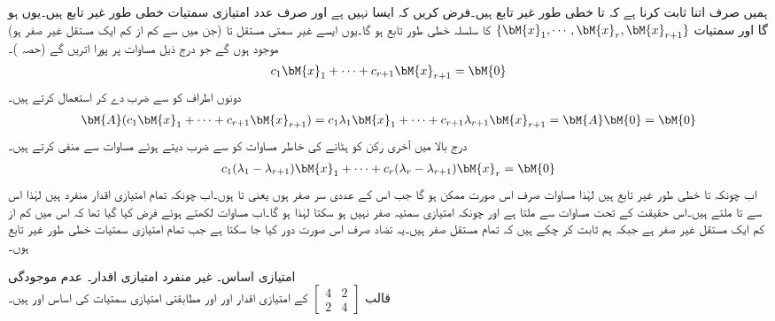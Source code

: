 ہمیں صرف اتنا ثابت کرنا ہے کہ  تا  خطی طور غیر تابع ہیں۔فرض کریں کہ ایسا نہیں ہے اور صرف  عدد امتیازی سمتیات خطی طور غیر تابع ہیں۔یوں  ہو گا اور  سمتیات
$\{\bM{x}_1, \cdots , \bM{x}_r,\bM{x}_{r+1}  \}$
کا سلسلہ خطی طور تابع ہو گا۔یوں ایسے غیر سمتی مستقل  تا  (جن میں سے کم از کم ایک مستقل غیر صفر ہو) موجود ہوں گے جو درج ذیل مساوات پر پورا اتریں گے (حصہ )۔
\begin{align}\label{مساوات_امتیازی_اساس_ثبوت_الف}
c_1\bM{x}_1+\cdots+c_{r+1}\bM{x}_{r+1}=\bM{0}
\end{align}  
دونوں اطراف کو  سے ضرب دے کر  استعمال کرتے ہیں۔
\begin{align}\label{مساوات_امتیازی_اساس_ثبوت_ب}
\bM{A}(c_1\bM{x}_1+\cdots+c_{r+1}\bM{x}_{r+1})=c_1\lambda_1\bM{x}_1+\cdots+c_{r+1}\lambda_{r+1}\bM{x}_{r+1}=\bM{A}\bM{0}=\bM{0}
\end{align}  
درج بالا میں آخری رکن کو ہٹانے کی خاطر مساوات  کو  سے ضرب دیتے ہوئے مساوات  سے منفی کرتے ہیں۔
\begin{align}\label{مساوات_امتیازی_اساس_ثبوت_پ}
c_1(\lambda_1-\lambda_{r+1})\bM{x}_1+\cdots+c_r(\lambda_r-\lambda_{r+1})\bM{x}_r=\bM{0}
\end{align}
اب چونکہ  تا  خطی طور غیر تابع ہیں لہٰذا مساوات  صرف اس صورت ممکن ہو گا جب اس کے عددی سر صفر ہوں یعنی  تا     ہوں۔اب چونکہ تمام امتیازی اقدار منفرد ہیں لہٰذا اس سے  تا  ملتے ہیں۔اس حقیقت کے تحت مساوات  سے  ملتا ہے اور چونکہ امتیازی سمتیہ صفر نہیں ہو سکتا لہٰذا  ہو گا۔اب  مساوات  لکھتے ہوئے فرض کیا گیا تھا کہ اس میں کم از کم ایک مستقل غیر صفر ہے جبکہ ہم ثابت کر چکے ہیں کہ تمام مستقل صفر ہیں۔یہ تضاد صرف اس صورت دور کیا جا سکتا ہے جب تمام امتیازی سمتیات خطی طور غیر تابع ہوں۔ 

\quad امتیازی اساس۔ غیر منفرد امتیازی اقدار۔ عدم موجودگی\\
قالب 
$ [\begin{smallmatrix}4&2\\2&4 \end{smallmatrix}]  $
کے امتیازی اقدار  اور  اور  مطابقتی امتیازی سمتیات کی اساس  اور  ہیں۔

